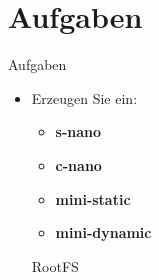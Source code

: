 \section{Aufgaben}

\begin{frame}{Aufgaben}
 \begin{itemize}
  \item Erzeugen Sie ein:
  \begin{itemize}
   \item {\bf s-nano}
   \item {\bf c-nano}
   \item {\bf mini-static}
   \item {\bf mini-dynamic}
  \end{itemize}
  RootFS
 \end{itemize}
\end{frame}
